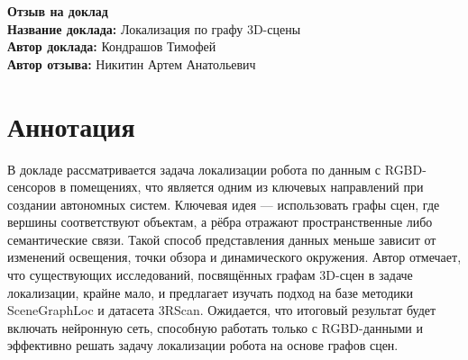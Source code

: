 \documentclass[11pt]{article}
\begin{document}
\begin{center}
    {\Large \textbf{Отзыв на доклад}}\\[1em]
    {\large \textbf{Название доклада:} Локализация по графу 3D-сцены}\\[0.5em]
    {\large \textbf{Автор доклада:} Кондрашов Тимофей}\\[0.5em]
    {\large \textbf{Автор отзыва:} Никитин Артем Анатольевич}\\[2em]
\end{center}

\section*{Аннотация}
В докладе рассматривается задача локализации робота по данным с RGBD-сенсоров в помещениях, что является одним из ключевых 
направлений при создании автономных систем. Ключевая идея — использовать графы сцен, где вершины соответствуют объектам, 
а рёбра отражают пространственные либо семантические связи. Такой способ представления данных меньше 
зависит от изменений освещения, точки обзора и динамического окружения. Автор отмечает, что существующих исследований, 
посвящённых графам 3D-сцен в задаче локализации, крайне мало, и предлагает изучать подход на базе методики SceneGraphLoc 
и датасета 3RScan. Ожидается, что итоговый результат будет включать нейронную сеть, способную работать только с RGBD-данными 
и эффективно решать задачу локализации робота на основе графов сцен.

\end{document}
